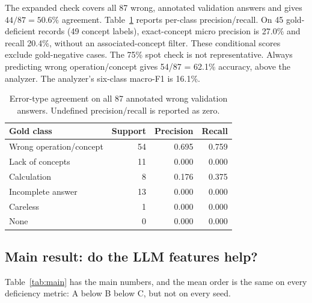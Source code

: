 \documentclass[11pt]{article}
\begin{document}
The expanded check covers all 87 wrong, annotated validation answers and gives
$44/87=50.6\%$ agreement. Table~\ref{tab:analyzer} reports per-class precision/recall.
On 45 gold-deficient records (49 concept labels), exact-concept micro precision is
27.0\% and recall 20.4\%, without an associated-concept filter. These conditional
scores exclude gold-negative cases. The 75\% spot check is not representative. Always predicting wrong operation/concept gives 54/87 = 62.1\% accuracy, above the analyzer. The analyzer's six-class macro-F1 is 16.1\%.
\begin{table}[htbp]\centering\small
\caption{Error-type agreement on all 87 annotated wrong validation answers. Undefined precision/recall is reported as zero.}\label{tab:analyzer}
\begin{tabular}{@{}lrrr@{}}\toprule
Gold class & Support & Precision & Recall\\\midrule
Wrong operation/concept & 54 & 0.695 & 0.759\\
Lack of concepts & 11 & 0.000 & 0.000\\
Calculation & 8 & 0.176 & 0.375\\
Incomplete answer & 13 & 0.000 & 0.000\\
Careless & 1 & 0.000 & 0.000\\
None & 0 & 0.000 & 0.000\\
\bottomrule\end{tabular}\end{table}

\subsection{Main result: do the LLM features help?}

Table~\ref{tab:main} has the main numbers, and the mean order is the same on every
deficiency metric: A below B below C, but not on every seed.
\end{document}
